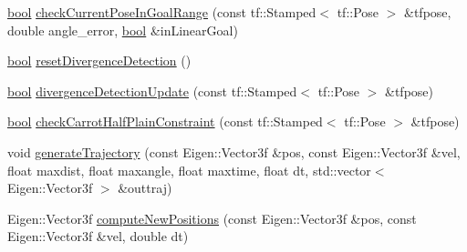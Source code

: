 \begin{DoxyCompactItemize}
\item 
\hyperlink{classbool}{bool} \hyperlink{classcl__move__base__z_1_1backward__local__planner_1_1BackwardLocalPlanner_a8b84e3961a79317a9c978ec054e4a112}{check\+Current\+Pose\+In\+Goal\+Range} (const tf\+::\+Stamped$<$ tf\+::\+Pose $>$ \&tfpose, double angle\+\_\+error, \hyperlink{classbool}{bool} \&in\+Linear\+Goal)
\item 
\hyperlink{classbool}{bool} \hyperlink{classcl__move__base__z_1_1backward__local__planner_1_1BackwardLocalPlanner_a35832ebefc43e5977e1222389244c8d3}{reset\+Divergence\+Detection} ()
\item 
\hyperlink{classbool}{bool} \hyperlink{classcl__move__base__z_1_1backward__local__planner_1_1BackwardLocalPlanner_ab1b01ecdb27641dde60661362d75465b}{divergence\+Detection\+Update} (const tf\+::\+Stamped$<$ tf\+::\+Pose $>$ \&tfpose)
\item 
\hyperlink{classbool}{bool} \hyperlink{classcl__move__base__z_1_1backward__local__planner_1_1BackwardLocalPlanner_a22938e354a4ec489101295ed7f2539f6}{check\+Carrot\+Half\+Plain\+Constraint} (const tf\+::\+Stamped$<$ tf\+::\+Pose $>$ \&tfpose)
\item 
void \hyperlink{classcl__move__base__z_1_1backward__local__planner_1_1BackwardLocalPlanner_a9e8921ca8ce379ca8ba321f82ca23cdc}{generate\+Trajectory} (const Eigen\+::\+Vector3f \&pos, const Eigen\+::\+Vector3f \&vel, float maxdist, float maxangle, float maxtime, float dt, std\+::vector$<$ Eigen\+::\+Vector3f $>$ \&outtraj)
\item 
Eigen\+::\+Vector3f \hyperlink{classcl__move__base__z_1_1backward__local__planner_1_1BackwardLocalPlanner_a0fe2ebd23fd79e8b574127e819ef0e14}{compute\+New\+Positions} (const Eigen\+::\+Vector3f \&pos, const Eigen\+::\+Vector3f \&vel, double dt)
\end{DoxyCompactItemize}

